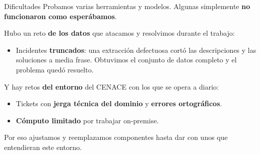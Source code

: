 \documentclass[xcolor=dvipsnames]{beamer}
\begin{document}



\begin{frame}{Dificultades}
Probamos varias herramientas y modelos. Algunas simplemente
\textbf{no funcionaron como esperábamos}.

\bigskip
Hubo un reto \textbf{de los datos} que atacamos y resolvimos durante el trabajo:
\begin{itemize}
    \item[$\bullet$] Incidentes \textbf{truncados}: una extracción defectuosa cortó
    las descripciones y las soluciones a media frase. Obtuvimos el conjunto de datos
    completo y el problema quedó resuelto.
\end{itemize}

\bigskip
Y hay retos \textbf{del entorno} del CENACE con los que se opera a diario:
\begin{itemize}
    \item[$\bullet$] Tickets con \textbf{jerga técnica del dominio} y \textbf{errores ortográficos}.
    \item[$\bullet$] \textbf{Cómputo limitado} por trabajar on-premise.
\end{itemize}
\bigskip
Por eso ajustamos y reemplazamos componentes hasta dar con unos que entendieran este entorno.

\end{frame}

\end{document}
